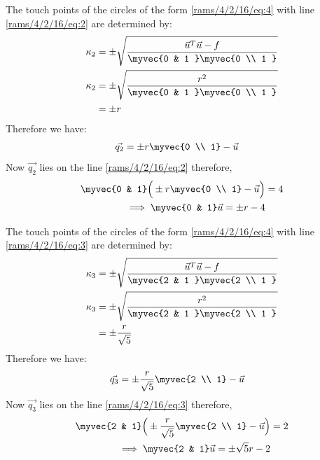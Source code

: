 The touch points of the circles of the form \eqref{rams/4/2/16/eq:4}  with line \eqref{rams/4/2/16/eq:2} are determined by:
\begin{align}
\kappa_{2} &= \pm \sqrt{\frac{\vec{u}^T\vec{u}-f}{\myvec{0 & 1 }\myvec{0 \\ 1 }}} \\
\kappa_{2} &= \pm \sqrt{\frac{r^2}{\myvec{0 & 1 }\myvec{0 \\ 1 }}} \\
& =  \pm {r}
\end{align}
Therefore we have:
\begin{align}
\vec{q_{2}} &= \pm{r}\myvec{0 \\ 1} - \vec{u}
\end{align}
Now $\vec{q_{2}}$ lies on the line \eqref{rams/4/2/16/eq:2} therefore,
\begin{align}
\myvec{0 & 1}\Big(\pm{r}\myvec{0 \\ 1} - \vec{u}\Big) &= 4 \\
\implies \myvec{0 & 1}\vec{u} = \pm{r}-4\label{rams/4/2/16/eq:11}
\end{align}

The touch points of the circles of the form \eqref{rams/4/2/16/eq:4}  with line \eqref{rams/4/2/16/eq:3} are determined by:
\begin{align}
\kappa_{3} &= \pm \sqrt{\frac{\vec{u}^T\vec{u}-f}{\myvec{2 & 1 }\myvec{2 \\ 1 }}} \\
\kappa_{3} &= \pm \sqrt{\frac{r^2}{\myvec{2 & 1 }\myvec{2 \\ 1 }}} \\
& =  \pm \dfrac{r}{\sqrt{5}}
\end{align}
Therefore we have:
\begin{align}
\vec{q_{3}} &= \pm \dfrac{r}{\sqrt{5}}\myvec{2 \\ 1} - \vec{u}
\end{align}
Now $\vec{q_{3}}$ lies on the line \eqref{rams/4/2/16/eq:3} therefore,
\begin{align}
\myvec{2 & 1}\Big(\pm \dfrac{r}{\sqrt{5}}\myvec{2 \\ 1} - \vec{u}\Big) &= 2 \\
\implies \myvec{2 & 1}\vec{u} = \pm\sqrt{5}r-2\label{rams/4/2/16/eq:12}
\end{align}

